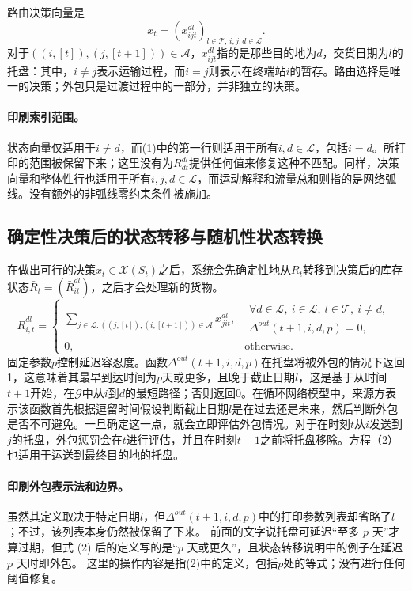 \documentclass{article}
\begin{document}
路由决策向量是
\[
x_t=(x_{ijt}^{dl})_{l\in\mathcal{T},\,i,j,d\in\mathcal{L}}.
\]
对于$((i,[t]),(j,[t+1]))\in\mathcal{A}$，$x_{ijt}^{dl}$指的是那些目的地为$d$，交货日期为$l$的托盘：其中，$i\ne j$表示运输过程，而$i=j$则表示在终端站$i$的暂存。路由选择是唯一的决策；外包只是过渡过程中的一部分，并非独立的决策。

\paragraph{印刷索引范围。}
状态向量仅适用于$i\ne d$，而(1)中的第一行则适用于所有$i,d\in\mathcal{L}$，包括$i=d$。所打印的范围被保留下来；这里没有为$R_{dt}^{dl}$提供任何值来修复这种不匹配。同样，决策向量和整体性行也适用于所有$i,j,d\in\mathcal{L}$，而运动解释和流量总和则指的是网络弧线。没有额外的非弧线零约束条件被施加。

\subsection*{确定性决策后的状态转移与随机性状态转换}
在做出可行的决策$x_t\in\mathcal{X}(S_t)$之后，系统会先确定性地从$R_t$转移到决策后的库存状态$\bar R_t=(\bar R_{it}^{dl})$，之后才会处理新的货物。
\begin{equation}
\bar R_{i,t}^{dl}=
\begin{cases}
\displaystyle\sum_{j\in\mathcal{L}:((j,[t]),(i,[t+1]))\in\mathcal{A}}x_{jit}^{dl},
&\begin{gathered}
\forall d\in\mathcal{L},\ i\in\mathcal{L},\ l\in\mathcal{T},\ i\ne d,\\[-2pt]
\Delta^{out}(t+1,i,d,p)=0,
\end{gathered}\\
0,&\text{otherwise}.
\end{cases}
\tag{2}
\end{equation}
固定参数$p$控制延迟容忍度。函数$\Delta^{out}(t+1,i,d,p)$在托盘将被外包的情况下返回1，这意味着其最早到达时间为$p$天或更多，且晚于截止日期$l$，这是基于从时间$t+1$开始，在$\mathcal{G}$中从$i$到$d$的最短路径；否则返回0。在循环网络模型中，来源方表示该函数首先根据逗留时间假设判断截止日期$l$是在过去还是未来，然后判断外包是否不可避免。一旦确定这一点，就会立即评估外包情况。对于在时刻$t$从$i$发送到$j$的托盘，外包惩罚会在$t$进行评估，并且在时刻$t+1$之前将托盘移除。方程（2）也适用于运送到最终目的地的托盘。

\paragraph{印刷外包表示法和边界。}
虽然其定义取决于特定日期$l$，但$\Delta^{out}(t+1,i,d,p)$中的打印参数列表却省略了$l$；不过，该列表本身仍然被保留了下来。 前面的文字说托盘可延迟“至多 $p$ 天”才算过期，但式 (2) 后的定义写的是“$p$ 天或更久”，且状态转移说明中的例子在延迟 $p$ 天时即外包。 这里的操作内容是指(2)中的定义，包括$p$处的等式；没有进行任何阈值修复。
\end{document}
